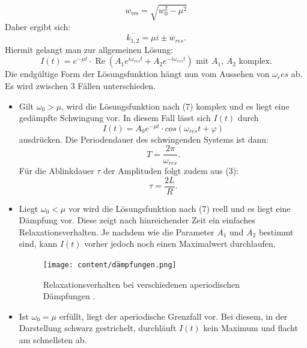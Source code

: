  \begin{equation}
 w_{\text{res}} = \sqrt{w_0^2-\mu^2}
 \end{equation}
  Daher ergibt sich:
 \begin{equation}
	 \overline{k_{1,2}} = \mu i \pm w_{res}\text{.}
 \end{equation}
 Hiermit gelangt man zur allgemeinen Lösung:
 \begin{equation}
   I(t) = e^{-\mu t} \cdot  \operatorname{Re}\left( A_1e^{i\omega_{res} t} + A_2e^{-i\omega_{res} t} \right) \text{ mit } A_1\text{, } A_2 \text{ komplex.}
 \end{equation}
 Die endgültige Form der Lösungsfunktion hängt nun vom Aussehen von $\omega_res$ ab.
  Es wird zwischen 3 Fällen unterschieden.
  \begin{itemize}

  \item Gilt $\omega_0 > \mu $, wird die Lösungsfunktion nach (7) komplex und es liegt eine gedämpfte Schwingung vor.
  In diesem Fall lässt sich $I(t)$ durch
  \begin{equation}
    I(t) = A_0 e^{-\mu t} \cdot cos(\omega_{res} t + \varphi)
  \end{equation}
  ausdrücken. Die Periodendauer des schwingenden Systems ist dann:
  \begin{equation}
    T = \frac{2 \pi}{\omega_{res}}\text{.}
  \end{equation}
  Für die Ablinkdauer $\tau$ der Amplituden folgt zudem aus (3):
  \begin{equation}
    \tau = \frac{2L}{R}\text{.}
  \end{equation}

  \item Liegt $\omega_0 < \mu $ vor wird die Lösungsfunktion nach (7) reell und es liegt eine Dämpfung vor. Diese zeigt nach hinreichender Zeit ein einfaches Relaxationsverhalten.
   Je nachdem wie die Parameter $A_1$ und $A_2$ bestimmt sind, kann $I(t)$ vorher jedoch noch einen
   Maximalwert durchlaufen.
   \begin{figure}[H]
     \centering
     \texttt{[image: content/dämpfungen.png]}
     \caption{Relaxationsverhalten bei verschiedenen aperiodischen Dämpfungen \cite{V354}.}
     \label{fig:Dämpfungen}
   \end{figure}

\item Ist $\omega_0 = \mu $ erfüllt, liegt der aperiodische Grenzfall vor. Bei diesem, in der Darstellung schwarz gestrichelt,
 durchläuft $I(t)$ kein Maximum und flacht am schnellsten ab.

\end{itemize}



